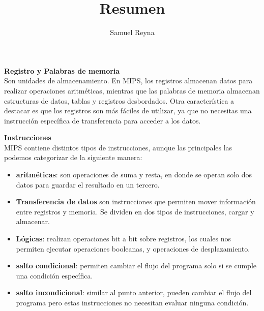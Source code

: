 \documentclass[12pt]{article}
\title{Resumen}
\author{Samuel Reyna}
\begin{document}
\maketitle

   \textbf{Registro y Palabras de memoria}\\
      Son unidades de almacenamiento. En MIPS, los registros almacenan datos para realizar operaciones aritméticas,
      mientras que las palabras de memoria almacenan estructuras de datos, tablas y registros desbordados. Otra característica 
      a destacar es que los registros son más fáciles de utilizar, ya que no necesitas una instrucción específica de transferencia 
      para acceder a los datos.
     
     \textbf{Instrucciones}\\
     MIPS contiene distintos tipos de instrucciones, aunque las principales
     las podemos categorizar de la siguiente manera:

     \begin{itemize}
        \item \textbf{aritméticas}: son operaciones de suma y resta, en donde se operan
         solo dos datos para guardar el resultado en un tercero.
        \item \textbf{Transferencia de datos} son instrucciones que permiten mover información
        entre registros y memoria. Se dividen en dos tipos de instrucciones, cargar y almacenar.
        \item \textbf{Lógicas}: realizan operaciones bit a bit sobre registros, los cuales nos
        permiten ejecutar operaciones booleanas, y operaciones de desplazamiento.
        \item \textbf{salto condicional}: permiten cambiar el flujo del programa solo si se cumple una condición específica.
        \item \textbf{salto incondicional}: similar al punto anterior, pueden cambiar el flujo del
        programa pero estas instrucciones no necesitan evaluar ninguna condición.
     \end{itemize}
\end{document}
